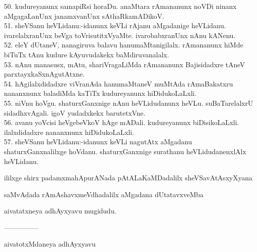 \documentclass{article}
\begin{document}
50. kudureyanunx samapiRsi horaDu. anaMtara rAmananunx noVDi ninanx aMgagaLanUnx janamxvanUnx sAthaRkamADikoV.\\
51. sheVSanu heVLidanu:-idanunx keVLi rAjanu aMgadanige heVLidanu. ivarelalxranUnx beVga toVrisutitxVyaMte. ivarobabxranUnx nAnu kANenu.\\
52. eleY dUtaneV, nanagiruva balavu hanumaMtanigilalx. rAmananunx hiMde biTuTx tAnu kudure kAyuvudakekx baMdiruvanalalx.\\
53. nAnu manasusx, mAtu, shariVragaLiMda rAmananunx Bajisidadxre tAneV parxtayxkaSxnAgutAtxne.\\
54. hAgilalxdidadxre viVranAda hanumaMtaneV muMtAda rAmaBakatxru nananxnunx baladiMda kaTiTx kudureyanunx hiDidukoLaLxli.\\
55. niVnu hoVgu. shaturxGanxnige nAnu heVLidudanunx heVLu. suBaTarelalxrU sidadhxvAgali. igoV yudadxkekx barutetxVne.\\
56. avanu yoVcisi heVgebeVkoV hAge mADali. kudureyanunx biDisikoLaLxli. ilalxdidadxre nananxnunx hiDidukoLaLxli.\\
57. sheVSanu heVLidanu:-idanunx keVLi nagutAtx aMgadanu shaturxGanxnalilxge hoVdanu. shaturxGanxnige surathanu heVLidudanenxlAlx heVLidanu.

\begin{center}
ililxge shirx padamxmahApurANada pAtALaKaMDadalilx sheVSavAtAsxyXyana
\end{center}

\begin{center}
saMvAdada rAmAshavxmeVdhadalilx aMgadana dUtatavxveMba
\end{center}

\begin{center}
aivatatxneya adhAyxyavu mugidudu.
\end{center}

\begin{center}
---------------
\end{center}

\begin{center}
aivatotxMdaneya adhAyxyavu
\end{center}
\end{document}

